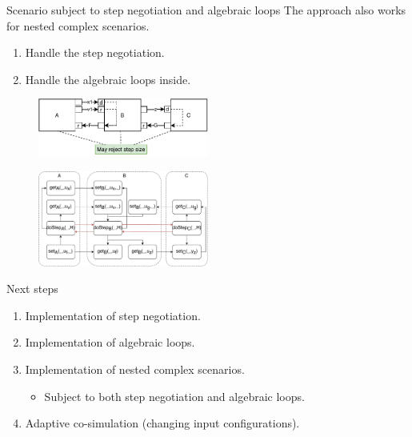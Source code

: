 \documentclass{beamer}
\begin{document}
\begin{frame}{Scenario subject to step negotiation and algebraic loops}
    The approach also works for nested complex scenarios.
    \begin{enumerate}
        \item Handle the step negotiation.
        \item Handle the algebraic loops inside.
    \end{enumerate}

    \begin{figure}    
        \includegraphics[width=0.5\textwidth]{images/loop_within_loop.pdf}
    \end{figure}
    \begin{figure}   
        \includegraphics[width=0.5\textwidth]{images/nested_graph.pdf}
    \end{figure}
\end{frame}

\begin{frame}{Next steps}
    \begin{enumerate}
        \item Implementation of step negotiation.
        \item Implementation of algebraic loops.
        \item Implementation of nested complex scenarios.
        \begin{itemize}
            \item Subject to both step negotiation and algebraic loops.
        \end{itemize}
        \item Adaptive co-simulation (changing input configurations).
    \end{enumerate}  
\end{frame}
\end{document}
